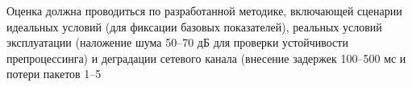 Оценка должна проводиться по разработанной методике, включающей сценарии идеальных условий (для фиксации базовых показателей), реальных условий эксплуатации (наложение шума 50–70 дБ для проверки устойчивости препроцессинга) и деградации сетевого канала (внесение задержек 100–500 мс и потери пакетов 1–5%
